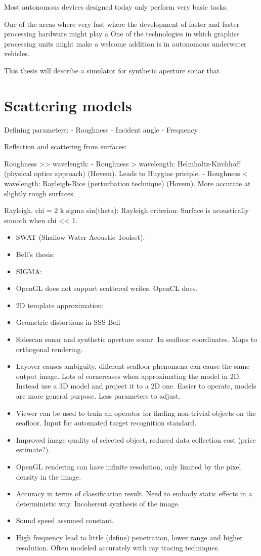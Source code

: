Most autonomous devices designed today only perform very basic tasks.

One of the areas where very fast where the development of faster and faster processing hardware might play a
One of the technologies in which graphics processing units might make a welcome addition is in autonomous underwater vehicles. 

This thesis will describe a simulator for synthetic aperture sonar that 

\section{Scattering models}


Defining parameters:
- Roughness
- Incident angle
- Frequency


Reflection and scattering from surfaces:

Roughness >> wavelength:
- Roughness > wavelength: Helmholtz-Kirchhoff (physical optics approach) (Hovem). Leads to Huygins priciple.
- Roughness < wavelength: Rayleigh-Rice (perturbation technique) (Hovem). More accurate at slightly rough surfaces.

Rayleigh. chi = 2 k sigma sin(theta): Rayleigh criterion: Surface is acoustically smooth when chi << 1.

\begin{itemize}
\item SWAT (Shallow Water Acoustic Toolset): 
\item Bell's thesis:
\item SIGMA:
\item OpenGL does not support scattered writes. OpenCL does.
\item 2D template approximation:
\item Geometric distortions in SSS \cite{Cobra1992} Bell
\item Sidescan sonar and synthetic aperture sonar. In seafloor coordinates. Maps to orthogonal rendering.
\item Layover causes ambiguity, different seafloor phenomena can cause the same output image. Lots of cornercases when approximating the model in 2D. Instead use a 3D model and project it to a 2D one. Easier to operate, models are more general purpose. Less parameters to adjust.
\item Viewer can be used to train an operator for finding non-trivial objects on the seafloor. Input for automated target recognition standard.
\item Improved image quality of selected object, reduced data collection cost (price estimate?).
\item OpenGL rendering can have infinite resolution, only limited by the pixel density in the image.
\item Accuracy in terms of classification result. Need to embody static effects in a deterministic way. Incoherent synthesis of the image.
\item Sound speed assumed constant.
\item High frequency lead to little (define) penetration, lower range and higher resolution. Often modeled accurately with ray tracing techniques.
\end{itemize}


